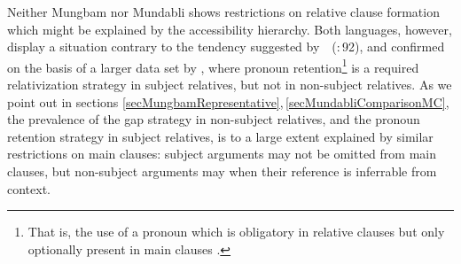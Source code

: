 \documentclass[10pt,twoside]{article}
\newcommand{\citepage}[2]{\citeauthor{#1}~{(\citeyear{#1}:\,{#2})}}
\begin{document}
Neither Mungbam nor Mundabli shows restrictions on relative clause formation which
might be explained by the accessibility hierarchy. Both languages,
however, display a situation contrary to the tendency suggested
by~\citepage{keenan:1977}{92}, and confirmed on the basis of a larger data set
by \cite{wals-2011-123,wals-2011-122}, where pronoun 
retention\footnote{That is, the use of a pronoun which is obligatory in relative clauses but only optionally present in main
clauses \citep{wals-2011-122}.}
is a required relativization strategy
in subject relatives, but not in non-subject relatives.
%
As we point out in sections \ref{secMungbamRepresentative},\,\ref{secMundabliComparisonMC}, 
the prevalence of the
gap strategy in non-subject relatives, and the pronoun retention
strategy in subject relatives, is to a large extent explained
by similar restrictions on main clauses: subject arguments
may not be omitted from main clauses, but non-subject arguments
may when their reference is inferrable from context.
\end{document}
